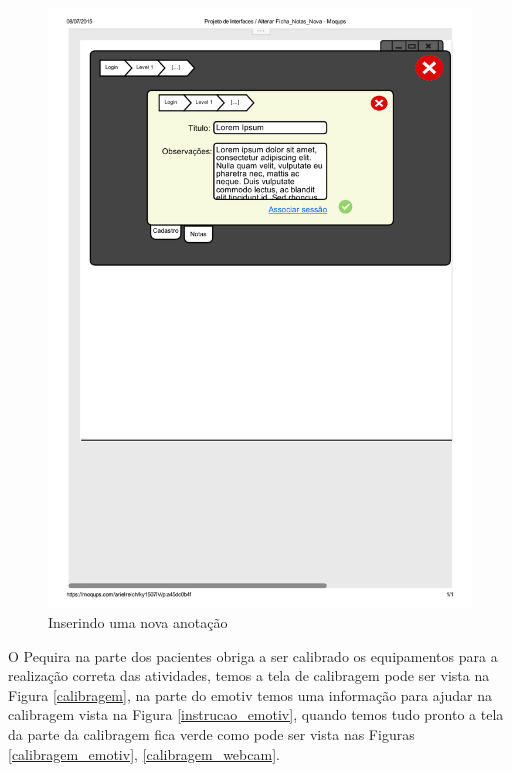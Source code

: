 \documentclass[12pt]{article}
\begin{document}
\begin{figure}[h]
\centering
\includegraphics[scale=0.4]{imagens/Alterar_Ficha_Notas_Nova.pdf}
\caption{Inserindo uma nova anotação}
\label{alterar_ficha_notas_nova}
\end{figure}

\newpage{}
O Pequira na parte dos pacientes obriga a ser calibrado os equipamentos para a realização correta das atividades, temos a tela de calibragem pode ser vista na Figura \ref{calibragem}, na parte do emotiv temos uma informação para ajudar na calibragem vista na Figura \ref{instrucao_emotiv}, quando temos tudo pronto a tela da parte da calibragem fica verde como pode ser vista nas Figuras \ref{calibragem_emotiv}, \ref{calibragem_webcam}.
\end{document}
